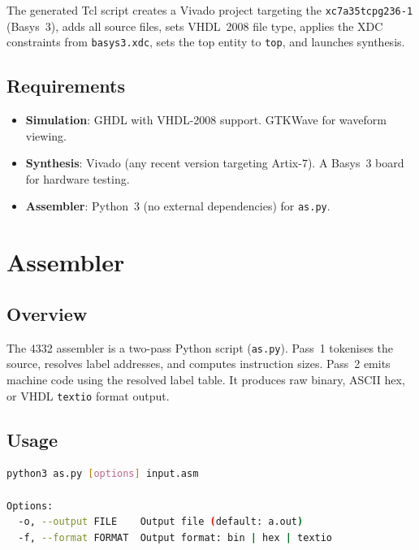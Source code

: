 \documentclass[a4paper,12pt]{report}
\begin{document}
The generated Tcl script creates a Vivado project targeting the \texttt{xc7a35tcpg236-1} (Basys~3), adds all source files, sets VHDL~2008 file type, applies the XDC constraints from \texttt{basys3.xdc}, sets the top entity to \texttt{top}, and launches synthesis.

\section{Requirements}

\begin{itemize}
    \item \textbf{Simulation}: GHDL with VHDL-2008 support. GTKWave for waveform viewing.
    \item \textbf{Synthesis}: Vivado (any recent version targeting Artix-7). A Basys~3 board for hardware testing.
    \item \textbf{Assembler}: Python~3 (no external dependencies) for \texttt{as.py}.
\end{itemize}

\chapter{Assembler}
\label{ch:assembler}

\section{Overview}

The 4332 assembler is a two-pass Python script (\texttt{as.py}). Pass~1 tokenises the source, resolves label addresses, and computes instruction sizes. Pass~2 emits machine code using the resolved label table. It produces raw binary, ASCII hex, or VHDL \texttt{textio} format output.

\section{Usage}

\begin{lstlisting}[language=bash, basicstyle=\ttfamily\small, frame=single,
                   backgroundcolor=\color{codebg}]
python3 as.py [options] input.asm

Options:
  -o, --output FILE    Output file (default: a.out)
  -f, --format FORMAT  Output format: bin | hex | textio
\end{lstlisting}
\end{document}
